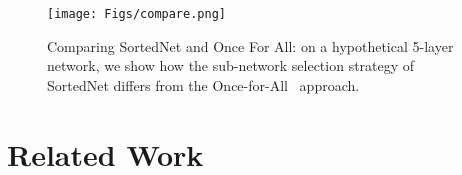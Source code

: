 \documentclass[letterpaper]{article} %
\newcommand{\xmark}{\ding{55}}%
\begin{document}
\begin{figure}[htb!]
    \centering
    \texttt{[image: Figs/compare.png]}
    \caption{Comparing SortedNet and Once For All: on a hypothetical 5-layer network, we show how the sub-network selection strategy of SortedNet differs from the Once-for-All~\cite{cai_once-for-all_2020} approach.}
    \label{fig:comp}
\end{figure}

\section{Related Work}
\label{ref::related}


\end{document}
